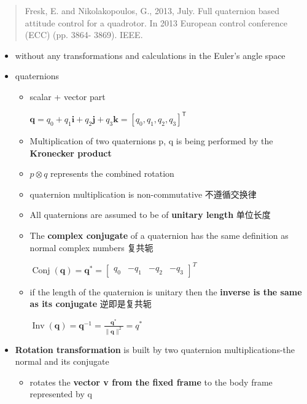 \documentclass[]{article}
\begin{document}
\begin{quote}
Fresk, E. and Nikolakopoulos, G., 2013, July. Full quaternion based
attitude control for a quadrotor. In 2013 European control conference
(ECC) (pp. 3864- 3869). IEEE.
\end{quote}

\begin{itemize}
\item
  without any transformations and calculations in the Euler's angle
  space
\item
  quaternions

  \begin{itemize}
  \item
    scalar + vector part

    \(\boldsymbol{q}=q_{0}+q_{1} \boldsymbol{i}+q_{2} \boldsymbol{j}+q_{3} \boldsymbol{k} = [q_0, q_1, q_2, q_3]^{\mathsf{T}}\)
  \item
    Multiplication of two quaternions p, q is being performed by the
    \textbf{Kronecker product}
  \item
    \(p \otimes q\) represents the combined rotation
  \item
    quaternion multiplication is non-commutative 不遵循交换律
  \item
    All quaternions are assumed to be of \textbf{unitary length}
    单位长度
  \item
    The \textbf{complex conjugate} of a quaternion has the same
    definition as normal complex numbers 复共轭

    \(\operatorname{Conj}(\boldsymbol{q})=\boldsymbol{q}^{*}=\left[\begin{array}{llll}q_{0} & -q_{1} & -q_{2} & -q_{3}\end{array}\right]^{T}\)
  \item
    if the length of the quaternion is unitary then the \textbf{inverse
    is the same as its conjugate} 逆即是复共轭

    \(\operatorname{Inv}(\boldsymbol{q})=\boldsymbol{q}^{-1}=\frac{\boldsymbol{q}^{*}}{\|\boldsymbol{q}\|^{2}} = {q}^{*}\)
  \end{itemize}
\item
  \textbf{Rotation transformation} is built by two quaternion
  multiplications-the normal and its conjugate

  \begin{itemize}
  \item
    rotates the \textbf{vector v from the fixed frame} to the body frame
    represented by q


\end{itemize}
\end{itemize}
\end{document}

